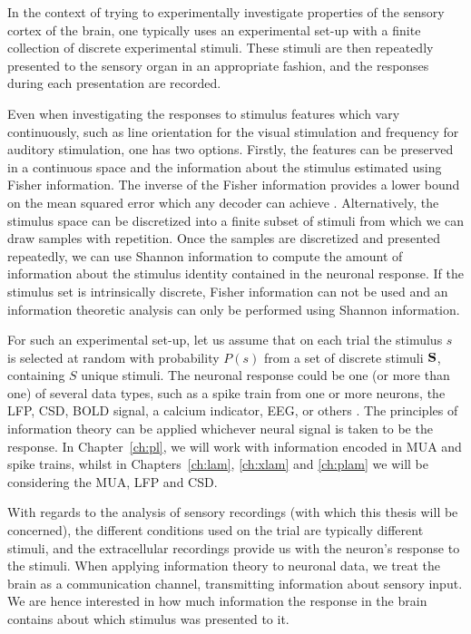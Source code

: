 In the context of trying to experimentally investigate properties of the sensory cortex of the brain, one typically uses an experimental set-up with a finite collection of discrete experimental stimuli.
These stimuli are then repeatedly presented to the sensory organ in an appropriate fashion, and the responses during each presentation are recorded.

Even when investigating the responses to stimulus features which vary continuously, such as line orientation for the visual stimulation and frequency for auditory stimulation, one has two options.
Firstly, the features can be preserved in a continuous space and the information about the stimulus estimated using Fisher information. The inverse of the Fisher information provides a lower bound on the mean squared error which any decoder can achieve \citep{Quiroga2009}.
Alternatively, the stimulus space can be discretized into a finite subset of stimuli from which we can draw samples with repetition.
Once the samples are discretized and presented repeatedly, we can use Shannon information to compute the amount of information about the stimulus identity contained in the neuronal response.
If the stimulus set is intrinsically discrete, Fisher information can not be used and an information theoretic analysis can only be performed using Shannon information.

For such an experimental set-up, let us assume that on each trial the stimulus $s$ is selected at random with probability $P(s)$ from a set of discrete stimuli $\mathbf{S}$, containing $S$ unique stimuli.
The neuronal response could be one (or more than one) of several data types, such as a spike train from one or more neurons, the \ac{LFP}, \ac{CSD}, \ac{BOLD} signal, a calcium indicator, \ac{EEG}, or others \citep{Magri2009,Quiroga2009}.
The principles of information theory can be applied whichever neural signal is taken to be the response.
In Chapter~\ref{ch:pl}, we will work with information encoded in \ac{MUA} and spike trains, whilst in Chapters~\ref{ch:lam}, \ref{ch:xlam} and \ref{ch:plam} we will be considering the \ac{MUA}, \ac{LFP} and \ac{CSD}.

With regards to the analysis of sensory recordings (with which this thesis will be concerned), the different conditions used on the trial are typically different stimuli, and the extracellular recordings provide us with the neuron's response to the stimuli.
When applying information theory to neuronal data, we treat the brain as a communication channel, transmitting information about sensory input.
We are hence interested in how much information the response in the brain contains about which stimulus was presented to it.

